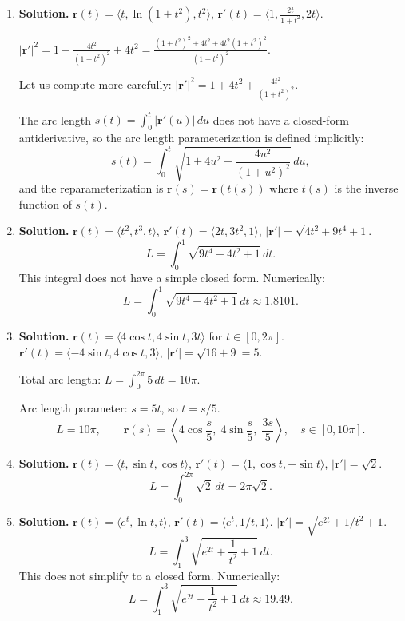 \begin{enumerate}
\item \textbf{Solution.}
$\mathbf{r}(t)=\langle t, \ln(1+t^2), t^2\rangle$, $\mathbf{r}'(t)=\langle 1, \frac{2t}{1+t^2}, 2t\rangle$.

$|\mathbf{r}'|^2=1+\frac{4t^2}{(1+t^2)^2}+4t^2 = \frac{(1+t^2)^2+4t^2+4t^2(1+t^2)^2}{(1+t^2)^2}$.

Let us compute more carefully:
$|\mathbf{r}'|^2 = 1+4t^2+\frac{4t^2}{(1+t^2)^2}$.

The arc length $s(t)=\int_0^t|\mathbf{r}'(u)|\,du$ does not have a closed-form antiderivative, so the arc length parameterization is defined implicitly:
\[
\boxed{s(t)=\int_0^t\sqrt{1+4u^2+\frac{4u^2}{(1+u^2)^2}}\,du,}
\]
and the reparameterization is $\mathbf{r}(s)=\mathbf{r}(t(s))$ where $t(s)$ is the inverse function of $s(t)$.

\item \textbf{Solution.}
$\mathbf{r}(t)=\langle t^2, t^3, t\rangle$, $\mathbf{r}'(t)=\langle 2t, 3t^2, 1\rangle$, $|\mathbf{r}'|=\sqrt{4t^2+9t^4+1}$.
\[
L=\int_0^1\sqrt{9t^4+4t^2+1}\,dt.
\]
This integral does not have a simple closed form. Numerically:
\[
\boxed{L=\int_0^1\sqrt{9t^4+4t^2+1}\,dt \approx 1.8101.}
\]


\item \textbf{Solution.}
$\mathbf{r}(t)=\langle 4\cos t, 4\sin t, 3t\rangle$ for $t\in[0,2\pi]$.
$\mathbf{r}'(t)=\langle -4\sin t, 4\cos t, 3\rangle$, $|\mathbf{r}'|=\sqrt{16+9}=5$.

Total arc length: $L=\int_0^{2\pi}5\,dt=10\pi$.

Arc length parameter: $s=5t$, so $t=s/5$.
\[
\boxed{L=10\pi,\qquad \mathbf{r}(s)=\left\langle 4\cos\frac{s}{5},\; 4\sin\frac{s}{5},\; \frac{3s}{5}\right\rangle,\quad s\in[0,10\pi].}
\]

\item \textbf{Solution.}
$\mathbf{r}(t)=\langle t, \sin t, \cos t\rangle$, $\mathbf{r}'(t)=\langle 1, \cos t, -\sin t\rangle$, $|\mathbf{r}'|=\sqrt{2}$.
\[
\boxed{L=\int_0^{2\pi}\sqrt{2}\,dt = 2\pi\sqrt{2}.}
\]

\item \textbf{Solution.}
$\mathbf{r}(t)=\langle e^t, \ln t, t\rangle$, $\mathbf{r}'(t)=\langle e^t, 1/t, 1\rangle$.
$|\mathbf{r}'|=\sqrt{e^{2t}+1/t^2+1}$.
\[
L=\int_1^3\sqrt{e^{2t}+\frac{1}{t^2}+1}\,dt.
\]
This does not simplify to a closed form. Numerically:
\[
\boxed{L=\int_1^3\sqrt{e^{2t}+\frac{1}{t^2}+1}\,dt \approx 19.49.}
\]


\end{enumerate}

